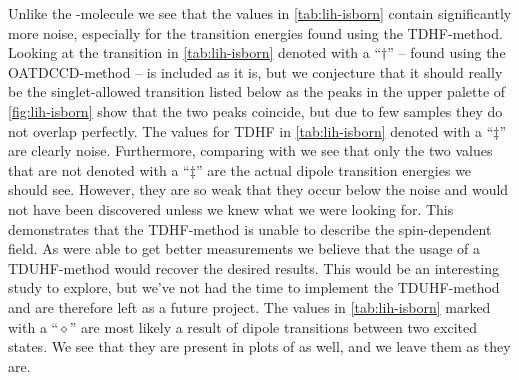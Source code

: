         Unlike the -molecule we see that the values in
        \autoref{tab:lih-isborn} contain significantly more noise, especially
        for the transition energies found using the TDHF-method.
        Looking at the transition in \autoref{tab:lih-isborn} denoted with a
        ``$\dagger$'' -- found using the OATDCCD-method -- is included as it is,
        but we conjecture that it should really be the singlet-allowed
        transition listed below as the peaks in the upper palette of
        \autoref{fig:lih-isborn} show that the two peaks coincide, but due to
        few samples they do not overlap perfectly.
        The values for TDHF in \autoref{tab:lih-isborn} denoted with a
        ``$\ddagger$'' are clearly noise.
        Furthermore, comparing with \citeauthor{isborn} \cite{isborn} we see
        that only the two values that are not denoted with a ``$\ddagger$'' are
        the actual dipole transition energies we should see.
        However, they are so weak that they occur below the noise and would not
        have been discovered unless we knew what we were looking for.
        This demonstrates that the TDHF-method is unable to describe the
        spin-dependent field.
        As \citeauthor{isborn} \cite{isborn} were able to get better
        measurements we believe that the usage of a TDUHF-method would recover
        the desired results.
        This would be an interesting study to explore, but we've not had the
        time to implement the TDUHF-method and are therefore left as a future
        project.
        The values in \autoref{tab:lih-isborn} marked with a ``$\diamond$'' are
        most likely a result of dipole transitions between two excited states.
        We see that they are present in plots of \citeauthor{isborn} as well,
        and we leave them as they are.

